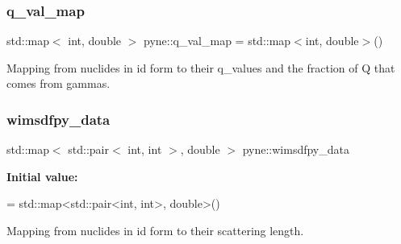 \subsubsection{\texorpdfstring{q\+\_\+val\+\_\+map}{q\_val\_map}}
{\footnotesize\ttfamily std\+::map$<$ int, double $>$ pyne\+::q\+\_\+val\+\_\+map = std\+::map$<$int, double$>$()}

Mapping from nuclides in id form to their q\+\_\+values and the fraction of Q that comes from gammas. \mbox{\label{namespacepyne_a2512ebcde5e39e49cd6ed25bb09ff374}} 
\subsubsection{\texorpdfstring{wimsdfpy\+\_\+data}{wimsdfpy\_data}}
{\footnotesize\ttfamily std\+::map$<$ std\+::pair$<$ int, int $>$, double $>$ pyne\+::wimsdfpy\+\_\+data}

{\bfseries Initial value\+:}
\begin{DoxyCode}
= 
  std::map<std::pair<int, int>, \textcolor{keywordtype}{double}>()
\end{DoxyCode}


Mapping from nuclides in id form to their scattering length. 

